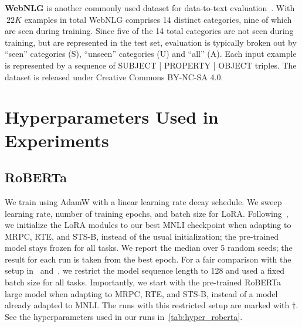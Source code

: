 \textbf{WebNLG} 
is another commonly used dataset for data-to-text evaluation~\citep{gardent2017webnlg}. With $~22K$ examples in total WebNLG comprises 14 distinct categories, nine of which are seen during training. Since five of the 14 total categories are not seen during training, but are represented in the test set, evaluation is typically broken out by ``seen'' categories (S),  ``unseen'' categories (U) and ``all'' (A). Each input example is represented by a sequence of SUBJECT | PROPERTY | OBJECT triples.
The dataset is released under Creative Commons BY-NC-SA 4.0.


\section{Hyperparameters Used in Experiments}

\subsection{RoBERTa}
\label{app:hps_roberta}

We train using AdamW with a linear learning rate decay schedule.
We sweep learning rate, number of training epochs, and batch size for LoRA.
Following~\citet{liu2019roberta}, we initialize the LoRA modules to our best MNLI checkpoint when adapting to MRPC, RTE, and STS-B, instead of the usual initialization; the pre-trained model stays frozen for all tasks.
We report the median over 5 random seeds; the result for each run is taken from the best epoch.
For a fair comparison with the setup in~\cite{houlsby_parameter-efficient_2019} and~\cite{pfeiffer2021adapterfusion}, we restrict the model sequence length to 128 and used a fixed batch size for all tasks.
Importantly, we start with the pre-trained RoBERTa large model when adapting to MRPC, RTE, and STS-B, instead of a model already adapted to MNLI.
The runs with this restricted setup are marked with $\dagger$.
See the hyperparameters used in our runs in~\autoref{tab:hyper_roberta}.

